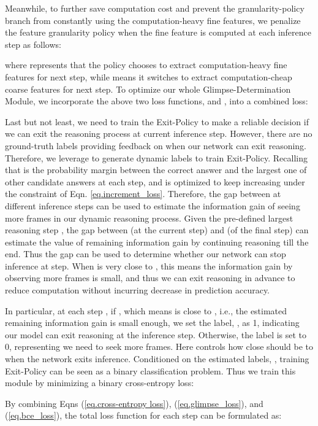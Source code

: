 \documentclass[final]{cvpr}
\begin{document}
Meanwhile, to further save computation cost and prevent the granularity-policy branch from constantly using the computation-heavy fine features, we penalize the feature granularity policy
when the fine feature is computed at each inference step  as follows:

where  represents that the policy chooses to extract computation-heavy fine features for next step, while  means it switches to extract computation-cheap coarse features for next step.
To optimize our whole Glimpse-Determination Module, we incorporate the above two loss functions,    and , into a combined loss:


Last but not least, we need to train the Exit-Policy to make a reliable decision if we can exit the reasoning process at current inference step. However, there are no ground-truth labels providing feedback on when our network can exit reasoning.
Therefore, we leverage  
to generate dynamic labels to train Exit-Policy. Recalling that  is the probability margin between the correct answer and the largest one of other candidate answers at each step, and  is optimized to keep increasing 
under the constraint of Eqn. \ref{eq.increment_loss}. 
Therefore, the gap between  at different inference steps can be used to estimate the information gain of seeing more frames in our dynamic reasoning process. Given the pre-defined largest reasoning step , the gap between  (at the current step) and  (of the final step) can estimate the value of remaining information gain by continuing reasoning till the end. Thus the gap can be used to determine whether our network can stop inference at  step. When  is very close to , this means the information gain by observing more frames is small, and thus we can exit reasoning in advance to reduce computation without incurring decrease in prediction accuracy.


In particular, at each step , if , which means  is close to , i.e., the estimated remaining information gain is small enough, we set the label, , as 1, indicating our model can exit reasoning at the  inference step. Otherwise, the label is set to 0, representing we need to seek more frames. Here  controls how close  should be to  when the network exits inference. Conditioned on the estimated labels, , training Exit-Policy can be seen as a binary classification problem. Thus we train this module by minimizing a binary cross-entropy loss:

By combining Eqns (\ref{eq.cross-entropy loss}), (\ref{eq.glimpse_loss}),
and (\ref{eq.bce_loss}), the total loss function for each step  can be formulated as:
\end{document}
